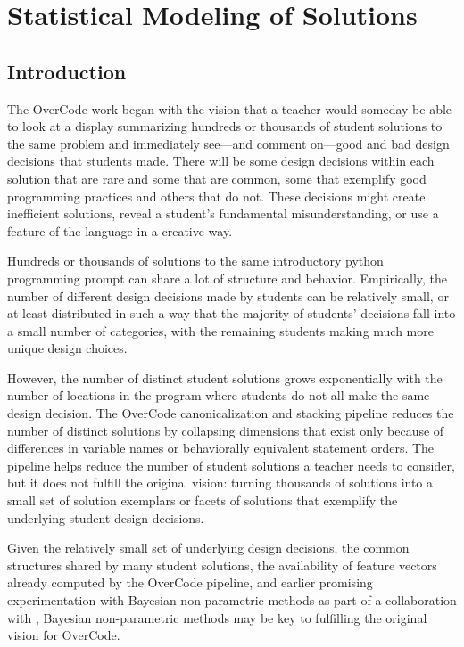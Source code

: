 \chapter{Statistical Modeling of Solutions}\label{chapter:bayesian}

\section{Introduction}

The OverCode work began with the vision that a teacher would someday be able to look at a display summarizing hundreds or thousands of student solutions to the same problem and immediately see---and comment on---good and bad design decisions that students made. There will be some design decisions within each solution that are rare and some that are common, some that exemplify good programming practices and others that do not. These decisions might create inefficient solutions, reveal a student's fundamental misunderstanding, or use a feature of the language in a creative way.

Hundreds or thousands of solutions to the same introductory python programming prompt can share a lot of structure and behavior. Empirically, the number of different design decisions made by students can be relatively small, or at least distributed in such a way that the majority of students' decisions fall into a small number of categories, with the remaining students making much more unique design choices. 

However, the number of distinct student solutions grows exponentially with the number of locations in the program where students do not all make the same design decision. The OverCode canonicalization and stacking pipeline reduces the number of distinct solutions by collapsing dimensions that exist only because of differences in variable names or behaviorally equivalent statement orders. The pipeline helps reduce the number of student solutions a teacher needs to consider, but it does not fulfill the original vision: turning thousands of solutions into a small set of solution exemplars or facets of solutions that exemplify the underlying student design decisions.

Given the relatively small set of underlying design decisions, the common structures shared by many student solutions, the availability of feature vectors already computed by the OverCode pipeline, and earlier promising experimentation with Bayesian non-parametric methods as part of a collaboration with \citet{beenthesis}, Bayesian non-parametric methods may be key to fulfilling the original vision for OverCode.

